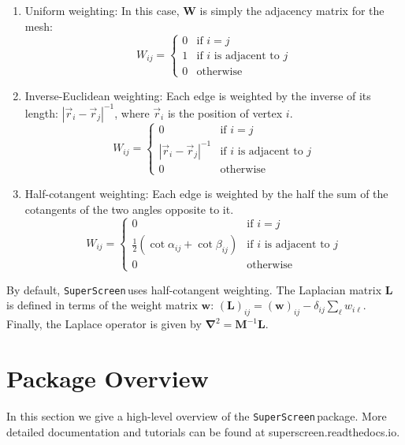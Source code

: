 \documentclass{article}
\newcommand{\SuperScreen}{\texttt{SuperScreen}\,}
\begin{document}
\begin{enumerate}
    \item{
        Uniform weighting: In this case, $\mathbf{W}$ is simply the adjacency matrix for the mesh:
        $$
            W_{ij} =
            \begin{cases}
                0&\text{if }i=j\\
                1&\text{if }i\text{ is adjacent to }j\\
                0&\text{otherwise}
            \end{cases}
        $$
    }
    \item{
        Inverse-Euclidean weighting: Each edge is weighted by the inverse of its length: $|\vec{r}_i-\vec{r}_j|^{-1}$, where $\vec{r}_i$ is the position of vertex $i$.
        $$
            W_{ij} =
            \begin{cases}
                0&\text{if }i=j\\
                |\vec{r}_i-\vec{r}_j|^{-1}&\text{if }i\text{ is adjacent to }j\\
                0&\text{otherwise}
            \end{cases}
        $$
    }
    \item{
        Half-cotangent weighting: Each edge is weighted by the half the sum of the cotangents of the two angles opposite to it.
        $$
            W_{ij} =
            \begin{cases}
                0&\text{if }i=j\\
                \frac{1}{2}\left(\cot\alpha_{ij}+\cot\beta_{ij}\right)&\text{if }i\text{ is adjacent to }j\\
                0&\text{otherwise}
            \end{cases}
        $$
    }
\end{enumerate}

By default, \SuperScreen uses half-cotangent weighting. The Laplacian matrix $\mathbf{L}$ is defined in terms of the weight matrix $\mathbf{w}$: $(\mathbf{L})_{ij} = (\mathbf{w})_{ij} - \delta_{ij}\sum_{\ell}w_{i\ell}$. Finally, the Laplace operator is given by $\mathbf{\nabla}^2 = \mathbf{M}^{-1}\mathbf{L}$.

\section{Package Overview}
\label{section:overview}

In this section we give a high-level overview of the \SuperScreen package. More detailed documentation and tutorials can be found at superscreen.readthedocs.io.
\end{document}
